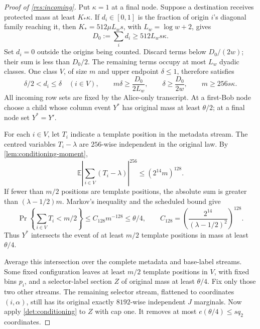\documentclass[11pt]{article} \usepackage[utf8]{inputenc}
\theoremstyle{plain} \newtheorem{theorem}{Theorem}[section]
\theoremstyle{definition} \newaliascnt{definition}{theorem}
\begin{document}
\begin{proof}[Proof of \cref{res:incoming}]
Put $\kappa=1$ at a final node. Suppose a destination receives protected mass
at least $K_*\kappa$. If $d_i\in[0,1]$ is the fraction of origin $i$'s diagonal
family reaching it, then $K_*=512\mu L_ws$, with $L_w=\log w+2$, gives
\[
D_0:=\sum_i d_i\ge512L_ws\kappa.
\]
Set $d_i=0$ outside the origins being counted. Discard terms below $D_0/(2w)$;
their sum is less than $D_0/2$. The remaining terms occupy at most $L_w$
dyadic classes. One class $V$, of size $m$ and upper endpoint $\delta\le1$,
therefore satisfies
\[
\delta/2<d_i\le\delta\quad(i\in V),\qquad
m\delta\ge\frac{D_0}{2L_w},\qquad
\delta\ge\frac{D_0}{2w},\qquad m\ge256s\kappa.
\]
All incoming row sets are fixed by the Alice-only transcript. At a first-Bob
node choose a child whose column event $Y^*$ has original mass at least
$\theta/2$; at a final node set $Y^*=Y'$.

For each $i\in V$, let $T_i$ indicate a template position in the metadata
stream. The centred variables $T_i-\lambda$ are $256$-wise independent in
the original law. By \cref{lem:conditioning-moment},
\[
\mathbb E\left|\sum_{i\in V}(T_i-\lambda)\right|^{256}
\le(2^{14}m)^{128}.
\]
If fewer than $m/2$ positions are template positions, the absolute sum is
greater than $(\lambda-1/2)m$. Markov's inequality and the scheduled bound give
\[
\Pr\left\{\sum_{i\in V}T_i<m/2\right\}
\le C_{128}m^{-128}\le\theta/4,
\qquad C_{128}=\left(\frac{2^{14}}{(\lambda-1/2)^2}\right)^{128}.
\]
Thus $Y^*$ intersects the event of at least $m/2$ template positions in mass
at least $\theta/4$.

Average this intersection over the complete metadata and base-label streams.
Some fixed configuration leaves at least $m/2$ template positions in $V$, with
fixed bins $p_i$, and a selector-label section $Z$ of original mass at least
$\theta/4$. Fix only those two other streams. The remaining selector stream,
flattened to coordinates $(i,\alpha)$, still has its original exactly
$8192$-wise independent $J$ marginals. Now apply \cref{det:conditioning} to $Z$
with cap one. It removes at most $e(\theta/4)\le sq_2$ coordinates.


\end{proof}
\end{document}
